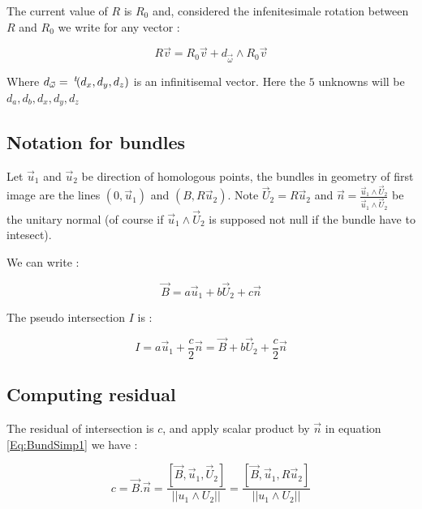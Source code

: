 The current value of $R$ is $R_0$ and, considered the infenitesimale rotation between $R$ and $R_0$
 we write for any  vector :

\begin{equation}
    R \vec v =  R_0 \vec v +  d_{\vec \omega }  \wedge   R_0 \vec v \label{Eq:BundSimp:LinB}
\end{equation}

Where $ d_{\vec \omega } = \; ^{t} \! (d_x,d_y,d_z)$  is an infinitisemal vector. Here the $5$ unknowns
will  be $d_a,d_b,d_x,d_y,d_z$

\subsection{Notation for bundles}

Let $\vec u_1$ and $\vec u_2 $ be  direction of homologous points, the bundles in geometry
of first image are the lines $(0,\vec u_1)$ and $(B,R\vec u_2)$. Note $\vec U_2 = R\vec u_2$
and $\vec n = \frac{\vec u_1 \wedge \vec U_2} {\vec u_1 \wedge \vec U_2} $
be the unitary normal (of course if $\vec u_1 \wedge \vec U_2$ is supposed not null if the bundle have to intesect).

We can write :

\begin{equation}
    \vec B =  a \vec u_1  +  b \vec U_2 + c \vec n \label{Eq:BundSimp1}
\end{equation}

The pseudo intersection  $I$ is :

\begin{equation}
    I =  a \vec u_1  +   \frac{c}{2} \vec n =  \vec B  +  b \vec U_2 +   \frac{c}{2} \vec n
\end{equation}

\subsection{Computing residual}


The residual of intersection is $c$, and apply scalar product by $\vec n$ in equation  \ref{Eq:BundSimp1}
we have :

\begin{equation}
	c = \vec B . \vec n 
	  =  \frac{[\vec B,\vec u_1,\vec U_2]}{ ||u_1 \wedge U_2||} 
	    = \frac{[\vec B,\vec u_1, R \vec u_2]}{||u_1 \wedge U_2||} 
\end{equation}

